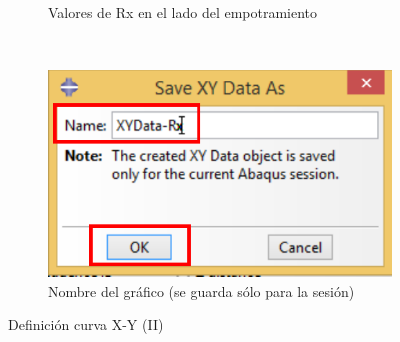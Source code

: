 \begin{enumerate}
\begin{figure}[H]
\begin{varwidth}{0.55\linewidth}
\begin{subfigure}{0.99\textwidth}
\caption{Valores de Rx en el lado del empotramiento}
\label{figu108}
\end{subfigure}
\\
\begin{subfigure}{0.75\textwidth}
\includegraphics[width=\textwidth]{./body/images/imagen109.pdf}
\caption{Nombre del gráfico (se guarda sólo para la sesión)}
\label{figu109}
\end{subfigure}
\end{varwidth}
\caption{Definición curva X-Y (II)}
\end{figure}



\end{enumerate}
